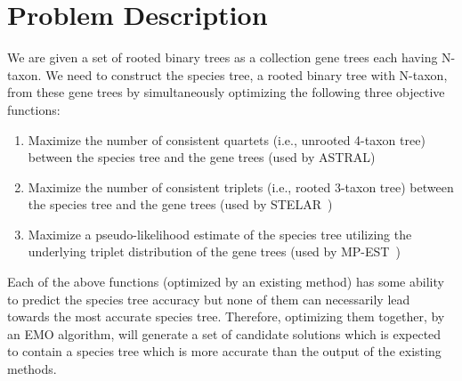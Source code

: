 \section{Problem Description}
\label{sec:problem}
We are given a set of rooted binary trees as a collection gene trees each having N-taxon. We need to construct the species tree, a rooted binary tree with N-taxon, from these gene trees by simultaneously optimizing the following three objective functions:  
\begin{enumerate}[label=F\arabic*.]
		
	\item Maximize the number of consistent quartets (i.e., unrooted 4-taxon tree) between the species tree and the gene trees (used by ASTRAL\cite{mirarab2014astral})
	\item Maximize the number of consistent triplets (i.e., rooted 3-taxon tree) between the species tree and the gene trees (used by STELAR~\cite{islam2019stelar})
	\item Maximize a pseudo-likelihood estimate of the species tree utilizing the underlying triplet distribution of the gene trees (used by MP-EST~\cite{liu2010maximum})
\end{enumerate}
Each of the above functions (optimized by an existing method) has some ability to predict the species tree accuracy but none of them can necessarily lead towards the most accurate species tree. Therefore, optimizing them together, by an EMO algorithm, will generate a set of candidate solutions which is expected to contain a species tree which is more accurate than the output of the existing methods.